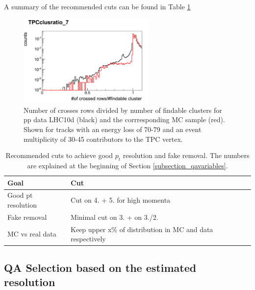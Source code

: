 \documentclass[12pt]{article}
\begin{document}
A summary of the recommended cuts can be found in Table \ref{table_cuts} \newline \newline \newline

\begin{figure}[htbp]
\begin{center}
\includegraphics[width=0.6\textwidth]{figures/pp_mc_data.pdf}
\caption{Number of crosses rows divided by number of findable clusters for pp data LHC10d (black) and the corrresponding MC sample (red). Shown for tracks with an energy loss of 70-79 and an event multiplicity of 30-45 contributors to the TPC vertex.}
\label{fig_pp_mc_data}
\end{center}
\end{figure}

\begin{table}[\htb]
 \begin{center}
\begin{tabular}{l||l}
\hline
\textbf{Goal} & \textbf{Cut} \\
\hline \hline
Good pt resolution  & Cut on 4. + 5. for high momenta \\
Fake removal & Minimal cut on 3. + on 3./2. \\
MC vs real data & Keep upper x\% of distribution in MC and data
respectively \\
\end{tabular} 
\end{center}
\caption[]{Recommended cuts to achieve good $p_{t}$ resolution and fake removal. The numbers are explained at the beginning of Section \ref{subsection_qavariables}.} \label{table_cuts}
\end{table} 

\subsection{QA Selection based on the estimated resolution} \label{subsection_COVARvariables}
\end{document}
